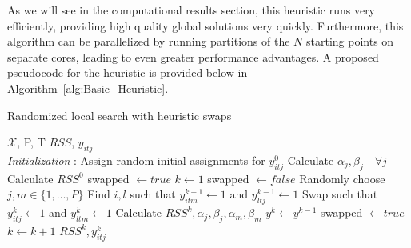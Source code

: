 As we will see in the computational results section, this heuristic runs very efficiently, providing high quality global solutions very quickly. Furthermore, this algorithm can be parallelized by running partitions of the $N$ starting points on separate cores, leading to even greater performance advantages. A proposed pseudocode for the heuristic is provided below in Algorithm~\ref{alg:Basic_Heuristic}. 

\begin{algorithm}
 \caption{Randomized local search with heuristic swaps}
 \label{alg:Basic_Heuristic}
 \begin{algorithmic}[1]
  \renewcommand{\algorithmicrequire}{\textbf{Input:}}
  \renewcommand{\algorithmicensure}{\textbf{Output:}}
 \REQUIRE $\boldsymbol{\mathcal{X}}$, P, T
 \ENSURE  $RSS$, $y_{itj}$
 \\ \textit{Initialization} : Assign random initial assignments for $y^{0}_{itj}$
  \STATE Calculate $\alpha_{j}, \beta_{j} \quad \forall j $
  \STATE Calculate $RSS^{0}$
  \STATE swapped $\leftarrow true$
  \STATE $k\leftarrow1$
  \STATE swapped $\leftarrow false$
  \STATE Randomly choose $j,m\in\{1,\ldots,P\}$
  \STATE Find $i,l$ such that $y^{k-1}_{itm}\leftarrow1$ and $y^{k-1}_{ltj}\leftarrow1$
  \STATE Swap such that $y^{k}_{itj}\leftarrow1$ and $y^{k}_{ltm}\leftarrow1$
  \STATE Calculate $RSS^{k}, \alpha_{j}, \beta_{j}, \alpha_{m}, \beta_{m}$
  \STATE $y^{k} \leftarrow y^{k-1}$
  \ELSE 
  \STATE swapped $\leftarrow true$
  \ENDIF
  \ENDFOR
  \STATE $ k \leftarrow k + 1 $
  \ENDWHILE
 \RETURN $RSS^{k}, y^{k}_{itj}$ 
 \end{algorithmic} 
 \end{algorithm}
